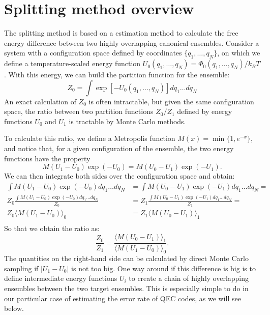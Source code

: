 \section{Splitting method overview}

The splitting method is based on a estimation method to calculate the
free energy difference between two highly overlapping canonical ensembles\cite{bennett1976efficient}.
Consider a system with a configuration space defined by coordinates $\{q_1, \ldots, q_N\}$,
on which we define a temperature-scaled energy function $U_0(q_1, \ldots, q_N) = \Phi_0(q_1, \ldots, q_N)/k_BT$.
With this energy, we can build the partition function for the ensemble:
$$ Z_0 = \int \exp[-U_0(q_1, \ldots, q_N)] dq_1\ldots dq_N $$
An exact calculation of $Z_0$ is often intractable, but given the same configuration space, the ratio
between two partition functions $Z_0/Z_1$ defined by energy functions $U_0$ and $U_1$ is tractable by Monte Carlo methods.

To calculate this ratio, we define a Metropolis function $M(x)= \min\{1, e^{-x}\}$,
and notice that, for a given configuration of the ensemble, the two energy functions have the property
$$ M(U_1-U_0)\exp(-U_0)=M(U_0-U_1)\exp(-U_1).$$
We can then integrate both sides over the configuration space and obtain:
\begin{equation}
    \begin{split}
        \int M(U_1-U_0)\exp(-U_0) dq_1\ldots dq_N & = \int M(U_0-U_1)\exp(-U_1) dq_1\ldots dq_N = \\
        Z_0\frac{\int M(U_1-U_0)\exp(-U_0) dq_1\ldots dq_N}{Z_0}& = Z_1 \frac{\int M(U_0-U_1)\exp(-U_1) dq_1\ldots dq_N}{Z_1}=\\
        Z_0\langle  M(U_1-U_0)\rangle_0 & = Z_1\langle  M(U_0-U_1)\rangle_1 \\
    \end{split}
\end{equation}
So that we obtain the ratio as:
\begin{equation}
 \frac{Z_0}{Z_1}=\frac{\langle  M(U_0-U_1)\rangle_1}{\langle  M(U_1-U_0)\rangle_0}.
\label{eq:ratio}
\end{equation}
The quantities on the right-hand side can be calculated by direct Monte Carlo sampling if $|U_1-U_0|$ is
not too big. One way around if this difference is big is to define intermediate energy functions $U_i$ to
create a chain of highly overlapping ensembles between the two target ensembles. This is especially simple to
do in our particular case of estimating the error rate of QEC codes, as we will see below.

